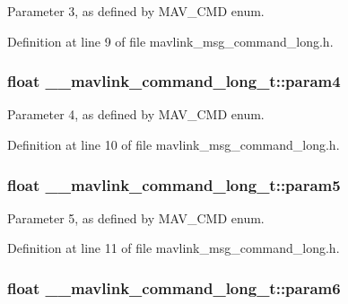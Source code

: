 Parameter 3, as defined by M\-A\-V\-\_\-\-C\-M\-D enum. 



Definition at line 9 of file mavlink\-\_\-msg\-\_\-command\-\_\-long.\-h.

\hypertarget{struct____mavlink__command__long__t_a1448f543670b7a8973c6461254cce429}{
\subsubsection[{param4}]{\setlength{\rightskip}{0pt plus 5cm}float \-\_\-\-\_\-mavlink\-\_\-command\-\_\-long\-\_\-t\-::param4}}\label{struct____mavlink__command__long__t_a1448f543670b7a8973c6461254cce429}


Parameter 4, as defined by M\-A\-V\-\_\-\-C\-M\-D enum. 



Definition at line 10 of file mavlink\-\_\-msg\-\_\-command\-\_\-long.\-h.

\hypertarget{struct____mavlink__command__long__t_a9c74f309b82fed5527bf1e7732424f21}{
\subsubsection[{param5}]{\setlength{\rightskip}{0pt plus 5cm}float \-\_\-\-\_\-mavlink\-\_\-command\-\_\-long\-\_\-t\-::param5}}\label{struct____mavlink__command__long__t_a9c74f309b82fed5527bf1e7732424f21}


Parameter 5, as defined by M\-A\-V\-\_\-\-C\-M\-D enum. 



Definition at line 11 of file mavlink\-\_\-msg\-\_\-command\-\_\-long.\-h.

\hypertarget{struct____mavlink__command__long__t_ad75daa212f56fd47cd0956f8dc4fdbd5}{
\subsubsection[{param6}]{\setlength{\rightskip}{0pt plus 5cm}float \-\_\-\-\_\-mavlink\-\_\-command\-\_\-long\-\_\-t\-::param6}}\label{struct____mavlink__command__long__t_ad75daa212f56fd47cd0956f8dc4fdbd5}


